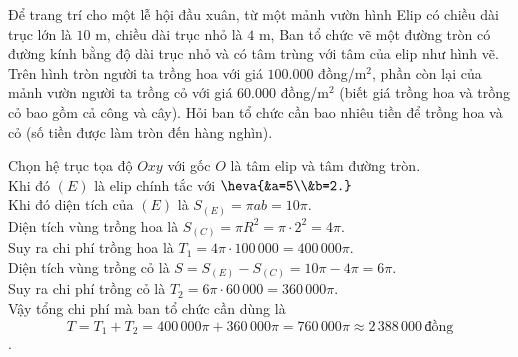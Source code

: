\begin{bt}%

Để trang trí cho một lễ hội đầu xuân, từ một mảnh vườn hình Elip có chiều dài trục lớn là $10$ m, chiều dài trục nhỏ là $4$ m, Ban tổ chức vẽ một đường tròn có đường kính bằng độ dài trục nhỏ và có tâm trùng với tâm của elip như hình vẽ. Trên hình tròn người ta trồng hoa với giá $100.000$ đồng/m$^2$, phần 
\immini
{
còn lại của mảnh vườn người ta trồng cỏ với giá $60.000$ đồng/m$^2$ (biết giá trồng hoa và trồng cỏ bao gồm cả công và cây). Hỏi ban tổ chức cần bao nhiêu tiền để trồng hoa và cỏ (số tiền được làm tròn đến hàng nghìn).
}
{
}
\loigiai
{
\begin{center}
\end{center}
Chọn hệ trục tọa độ $Oxy$ với gốc $O$ là tâm elip và tâm đường tròn. \\
Khi đó $(E)$ là elip chính tắc với $\heva{&a=5\\&b=2.}$ \\
Khi đó diện tích của $(E)$ là $S_{(E)}=\pi ab=10\pi$. \\
Diện tích vùng trồng hoa là $S_{(C)}=\pi R^2=\pi\cdot2^2=4\pi$. \\
Suy ra chi phí trồng hoa là $T_1=4\pi\cdot100\,000=400\,000\pi$. \\
Diện tích vùng trồng cỏ là $S=S_{(E)}-S_{(C)}=10\pi-4\pi=6\pi$. \\
Suy ra chi phí trồng cỏ là $T_2=6\pi\cdot60\,000=360\,000\pi$. \\
Vậy tổng chi phí mà ban tổ chức cần dùng là
\[T=T_1+T_2=400\,000\pi+360\,000\pi=760\,000\pi\approx2\,388\,000\,\text{đồng}\]. \\
}
\end{bt}

